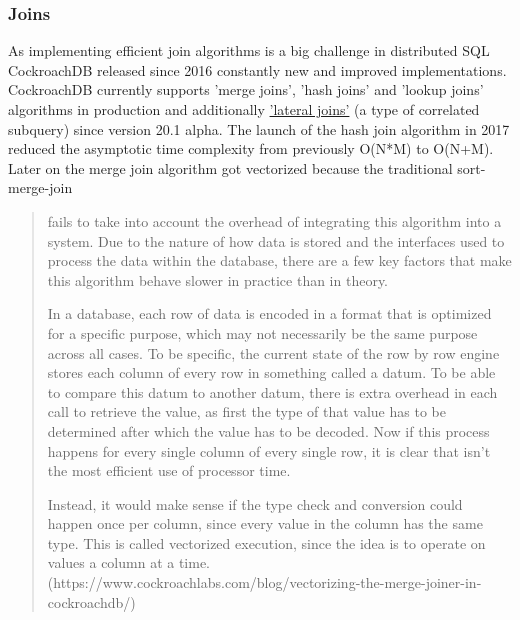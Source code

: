\subsubsection{Joins}
As implementing efficient join algorithms is a big challenge in distributed SQL CockroachDB released since 2016 
constantly new and improved implementations.
CockroachDB currently supports ’merge joins’, ’hash joins’ and ’lookup joins' algorithms in production and additionally
\href{https://www.cockroachlabs.com/blog/using-lateral-joins-in-the-cockroachdb-20-1-alpha/}{’lateral joins’} (a type of correlated subquery) since version 20.1 alpha.
The launch of the hash join algorithm in 2017 reduced the asymptotic time complexity from previously O(N*M) to O(N+M).
Later on the merge join algorithm got vectorized because the traditional sort-merge-join \begin{quote} fails to take into 
account the overhead of integrating this algorithm into a system. Due to the nature of how data is stored and the interfaces 
used to process the data within the database, there are a few key factors that make this algorithm behave slower in practice 
than in theory. 

In a database, each row of data is encoded in a format that is optimized for a specific purpose, which may 
not necessarily be the same purpose across all cases. To be specific, the current state of the row by row engine stores each 
column of every row in something called a datum. To be able to compare this datum to another datum, there is extra overhead 
in each call to retrieve the value, as first the type of that value has to be determined after which the value has to be 
decoded. Now if this process happens for every single column of every single row, it is clear that isn’t the most efficient 
use of processor time.

Instead, it would make sense if the type check and conversion could happen once per column, since every value in the column 
has the same type. This is called vectorized execution, since the idea is to operate on values a column at a time.
(https://www.cockroachlabs.com/blog/vectorizing-the-merge-joiner-in-cockroachdb/)
\end{quote}


